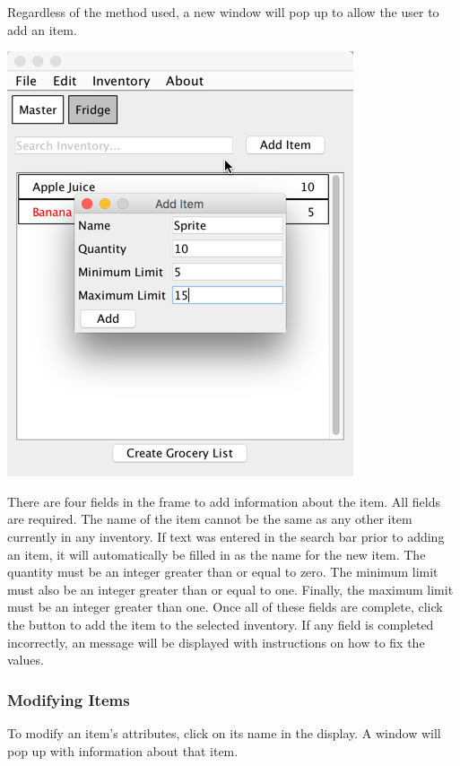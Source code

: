 \documentclass[letterpaper,12pt]{article}
\begin{document}
Regardless of the method used, a new window will pop up to allow the user to add an item.\\

\centerline{\includegraphics[scale=0.5]{04.png}}

There are four fields in the frame to add information about the item. All fields are required. The name of the item cannot be the same as any other item currently in any inventory. If text was entered in the search bar prior to adding an item, it will automatically be filled in as the name for the new item. The quantity must be an integer greater than or equal to zero. The minimum limit must also be an integer greater than or equal to one. Finally, the maximum limit must be an integer greater than one. Once all of these fields are complete, click the  button to add the item to the selected inventory. If any field is completed incorrectly, an message will be displayed with instructions on how to fix the values.


		\subsubsection{Modifying Items}
To modify an item's attributes, click on its name in the display. A window will pop up with information about that item. 
\end{document}
